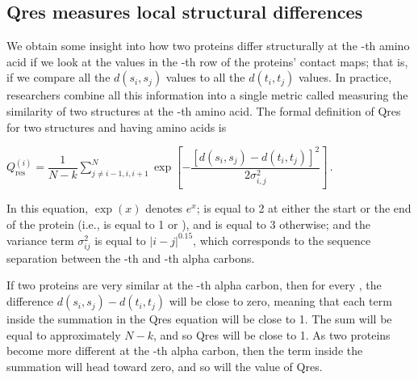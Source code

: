 \begin{qbox}\end{qbox}

\FloatBarrier
{}
\subsection{Qres measures local structural differences}

We obtain some insight into how two proteins differ structurally at the -th amino acid if we look at the values in the -th row of the proteins' contact maps; that is, if we compare all the $d(s_{i}, s_{j})$ values to all the $d(t_{i}, t_{j})$ values. In practice, researchers combine all this information into a single metric called  measuring the similarity of two structures at the -th amino acid. The formal definition of Qres for two structures  and  having  amino acids is

\begin{center}
$Q_{\text{res}}^{(i)} = \dfrac{1}{N-k} \displaystyle \sum^{N}_{j\neq i-1,i,i+1} \exp\left[-\dfrac{[d(s_i,s_j)-d(t_i,t_j)]^2}{2\sigma^2_{i,j}}\right]$\,.
\end{center}

\noindent In this equation, $\exp(x)$ denotes $e^{x}$;  is equal to 2 at either the start or the end of the protein (i.e.,  is equal to 1 or ), and  is equal to 3 otherwise; and the variance term $\sigma_{ij}^2$ is equal to $\left\lvert{i-j}\right\rvert ^{0.15}$, which corresponds to the sequence separation between the -th and -th alpha carbons.\\

\begin{note}\end{note}

If two proteins are very similar at the -th alpha carbon, then for every , the difference $d(s_{i}, s_{j}) - d(t_{i}, t_{j})$ will be close to zero, meaning that each term inside the summation in the Qres equation will be close to 1. The sum will be equal to approximately $N - k$, and so Qres will be close to 1. As two proteins become more different at the -th alpha carbon, then the term inside the summation will head toward zero, and so will the value of Qres.

